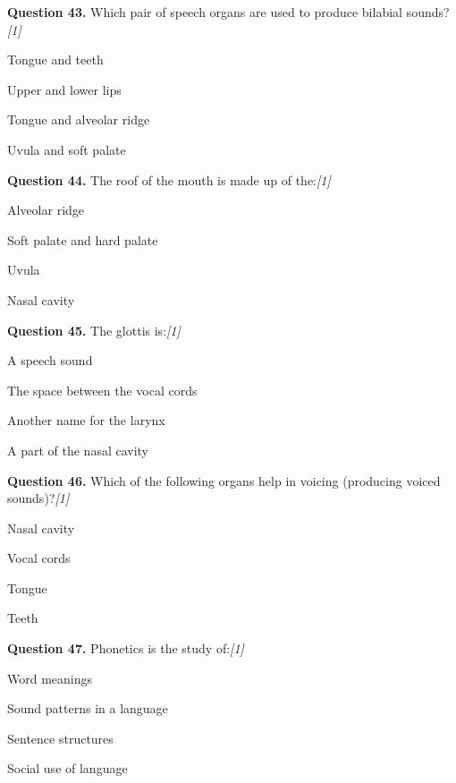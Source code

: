 \documentclass[11pt,a4paper]{article}
\newcommand{\pts}[1]{\hfill   \textit{[#1]}}
\begin{document}
\medskip


\noindent   \textbf{Question 43.} Which pair of speech organs are used to produce bilabial sounds?\pts{1}

\begin{parts}
  \item Tongue and teeth
  \item Upper and lower lips
  \item Tongue and alveolar ridge
  \item Uvula and soft palate
\end{parts}

\medskip


\noindent   \textbf{Question 44.} The roof of the mouth is made up of the:\pts{1}

\begin{parts}
  \item Alveolar ridge
  \item Soft palate and hard palate
  \item Uvula
  \item Nasal cavity
\end{parts}

\medskip


\noindent   \textbf{Question 45.} The glottis is:\pts{1}

\begin{parts}
  \item A speech sound
  \item The space between the vocal cords
  \item Another name for the larynx
  \item A part of the nasal cavity
\end{parts}

\medskip


\noindent   \textbf{Question 46.} Which of the following organs help in voicing (producing voiced sounds)?\pts{1}

\begin{parts}
  \item Nasal cavity
  \item Vocal cords
  \item Tongue
  \item Teeth
\end{parts}

\medskip


\noindent   \textbf{Question 47.} Phonetics is the study of:\pts{1}

\begin{parts}
  \item Word meanings
  \item Sound patterns in a language
  \item Sentence structures
  \item Social use of language
\end{parts}
\end{document}
